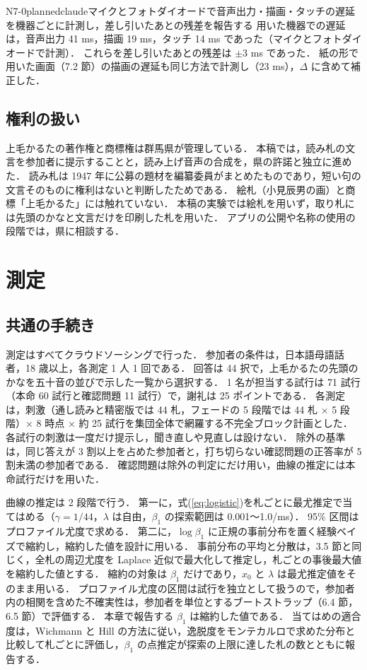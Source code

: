 \begin{fd}{N7-0}{planned}{claude}{マイクとフォトダイオードで音声出力・描画・タッチの遅延を機器ごとに計測し，差し引いたあとの残差を報告する}
用いた機器での遅延は，音声出力 41 ms，描画 19 ms，タッチ 14 ms であった（マイクとフォトダイオードで計測）．
これらを差し引いたあとの残差は $\pm 3$ ms であった．
紙の形で用いた画面（7.2 節）の描画の遅延も同じ方法で計測し（23 ms），$\Delta$ に含めて補正した．
\end{fd}

\subsection{権利の扱い}

上毛かるたの著作権と商標権は群馬県が管理している．
本稿では，読み札の文言を参加者に提示することと，読み上げ音声の合成を，県の許諾と独立に進めた．
読み札は 1947 年に公募の題材を編纂委員がまとめたものであり，短い句の文言そのものに権利はないと判断したためである．
絵札（小見辰男の画）と商標「上毛かるた」には触れていない．
本稿の実験では絵札を用いず，取り札には先頭のかなと文言だけを印刷した札を用いた．
アプリの公開や名称の使用の段階では，県に相談する．

\section{測定}

\subsection{共通の手続き}

測定はすべてクラウドソーシングで行った．
参加者の条件は，日本語母語話者，18 歳以上，各測定 1 人 1 回である．
回答は 44 択で，上毛かるたの先頭のかなを五十音の並びで示した一覧から選択する．
1 名が担当する試行は 71 試行（本命 60 試行と確認問題 11 試行）で，謝礼は 25 ポイントである．
各測定は，刺激（通し読みと精密版では 44 札，フェードの 5 段階では 44 札 × 5 段階）× 8 時点 × 約 25 試行を集団全体で網羅する不完全ブロック計画とした．
各試行の刺激は一度だけ提示し，聞き直しや見直しは設けない．
除外の基準は，同じ答えが 3 割以上を占めた参加者と，打ち切らない確認問題の正答率が 5 割未満の参加者である．
確認問題は除外の判定にだけ用い，曲線の推定には本命試行だけを用いた．

曲線の推定は 2 段階で行う．
第一に，式(\ref{eq:logistic})を札ごとに最尤推定で当てはめる（$\gamma = 1/44$，$\lambda$ は自由，$\beta_1$ の探索範囲は 0.001〜1.0/ms）．
95\% 区間はプロファイル尤度で求める．
第二に，$\log \beta_1$ に正規の事前分布を置く経験ベイズで縮約し，縮約した値を設計に用いる．
事前分布の平均と分散は，3.5 節と同じく，全札の周辺尤度を Laplace 近似で最大化して推定し，札ごとの事後最大値を縮約した値とする．
縮約の対象は $\beta_1$ だけであり，$x_0$ と $\lambda$ は最尤推定値をそのまま用いる．
プロファイル尤度の区間は試行を独立として扱うので，参加者内の相関を含めた不確実性は，参加者を単位とするブートストラップ（6.4 節，6.5 節）で評価する．
本章で報告する $\beta_1$ は縮約した値である．
当てはめの適合度は，Wichmann と Hill の方法\cite{wichmann2001}に従い，逸脱度をモンテカルロで求めた分布と比較して札ごとに評価し，$\beta_1$ の点推定が探索の上限に達した札の数とともに報告する．

